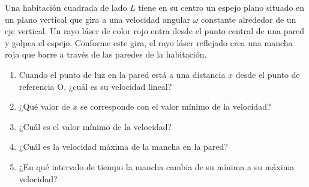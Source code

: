 \item Una habitación cuadrada de lado $L$ tiene en su centro un espejo plano situado en un plano vertical que gira a una velocidad angular $\omega$ constante alrededor de un eje vertical. Un rayo láser de color rojo entra desde el punto central de una pared y golpea el espejo. Conforme este gira, el rayo láser reflejado crea una mancha roja que barre a través de las paredes de la habitación.
\begin{enumerate}
    \item Cuando el punto de luz en la pared está a una distancia $x$ desde el punto de referencia O, ¿cuál es su velocidad lineal?
    \item ¿Qué valor de $x$ se corresponde con el valor mínimo de la velocidad?
    \item ¿Cuál es el valor mínimo de la velocidad?
    \item ¿Cuál es la velocidad máxima de la mancha en la pared?
    \item ¿En qué intervalo de tiempo la mancha cambia de su mínima a su máxima velocidad?
\end{enumerate}